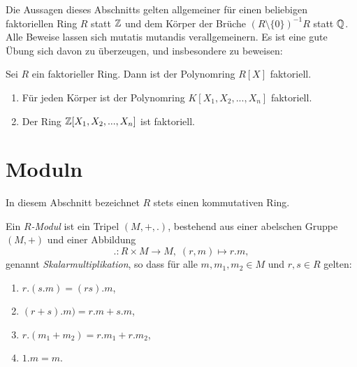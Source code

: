 \documentclass{book}
\begin{document}
Die Aussagen dieses Abschnitts gelten allgemeiner für einen beliebigen
faktoriellen Ring $R$ statt $\mathbb{Z}$ und dem Körper der Brüche $(R \setminus \{0
\})^{-1}R$ statt $\mathbb{Q}$. Alle Beweise lassen sich mutatis mutandis
verallgemeinern. Es ist eine gute Übung sich davon zu überzeugen, und
insbesondere zu beweisen:

\begin{thm}
    \label{thm:fakt}
    Sei $R$ ein faktorieller Ring. Dann ist der Polynomring $R[X]$ faktoriell. 
\end{thm}

\begin{exas}
    \label{exas:faktoriell}
    \begin{enumerate}
        \item Für jeden Körper ist der Polynomring $K[X_1,X_2,...,X_n]$ faktoriell.
        \item Der Ring $\mathbb{Z}[X_1,X_2,...,X_n]$ ist faktoriell. 
    \end{enumerate}
\end{exas}

\section{Moduln}%
\label{sec:moduln}

In diesem Abschnitt bezeichnet $R$ stets einen kommutativen Ring. 

\begin{defi}
    \label{defi:modul}
    Ein \emph{$R$-Modul} ist ein Tripel $(M,+,.)$, bestehend
    aus einer abelschen Gruppe $(M,+)$ und einer Abbildung
    \[
        .: R \times M \to M, \; (r,m) \mapsto r.m,
    \]
    genannt {\em Skalarmultiplikation}, so dass für alle $m,m_1,m_2 \in M$ und
    $r,s \in R$ gelten:
    \begin{enumerate}[label=(M\arabic*)]
        \item $r.(s.m) = (rs).m$,
        \item $(r+s).m) = r.m + s.m$,
        \item $r.(m_1 + m_2) = r.m_1 + r. m_2$,
        \item $1.m = m$. 
    \end{enumerate}
\end{defi}
\end{document}
